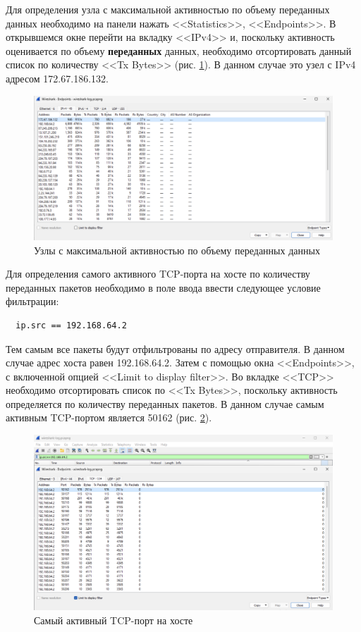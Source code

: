 \documentclass[a4paper, 14pt]{extarticle}
\begin{document}
Для определения узла с максимальной активностью по объему переданных данных
необходимо на панели нажать <<Statistics>>, <<Endpoints>>. В открывшемся окне
перейти на вкладку <<IPv4>> и, поскольку активность оценивается по объему
\textbf{переданных} данных, необходимо отсортировать данный список по количеству
<<Tx Bytes>> (рис. \ref{fig:endpoints-by-tx-bytes}). В данном случае это узел с
IPv4 адресом 172.67.186.132.

\begin{figure}[H]
  \centering
  \includegraphics[width=\textwidth]{images/endpoints-by-tx-bytes.png}
  \caption{Узлы с максимальной активностью по объему переданных данных}
  \label{fig:endpoints-by-tx-bytes}
\end{figure}

Для определения самого активного TCP-порта на хосте по количеству переданных
пакетов необходимо в поле ввода ввести следующее условие фильтрации:
\begin{verbatim}
  ip.src == 192.168.64.2
\end{verbatim}
Тем самым все пакеты будут отфильтрованы по адресу отправителя. В данном случае
адрес хоста равен 192.168.64.2. Затем с помощью окна <<Endpoints>>, с включенной
опцией <<Limit to display filter>>. Во вкладке <<TCP>> необходимо отсортировать
список по <<Tx Bytes>>, поскольку активность определяется по количеству
переданных пакетов. В данном случае самым активным TCP-портом является 50162
(рис. \ref{fig:tcp-by-tx-bytes}).

\begin{figure}[H]
  \centering
  \includegraphics[width=\textwidth]{images/tcp-by-tx-bytes.png}
  \caption{Самый активный TCP-порт на хосте}
  \label{fig:tcp-by-tx-bytes}
\end{figure}
\end{document}
